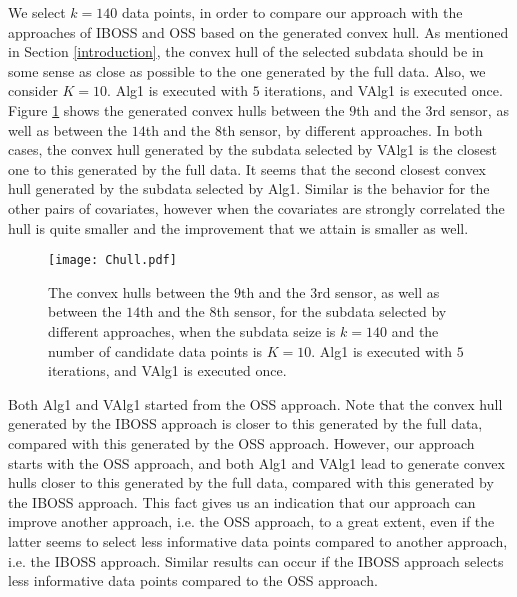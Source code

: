 \documentclass[12pt]{article}
\theoremstyle{definition}
\begin{document}
	We select $k=140$ data points, in order to compare our approach with the approaches of IBOSS and OSS based on the generated convex hull. As mentioned in Section \ref{introduction}, the convex hull of the selected subdata should be in some sense as close as possible to the one generated by the full data. Also, we consider $K=10$. Alg1 is executed with $5$ iterations, and VAlg1 is executed once. Figure \ref{chull} shows the generated convex hulls between the $9$th and the $3$rd sensor, as well as between the $14$th and the $8$th sensor, by different approaches. In both cases, the convex hull generated by the subdata selected by VAlg1 is the closest one to this generated by the full data. It seems that the second closest convex hull generated by the subdata selected by Alg1. Similar is the behavior for the other pairs of covariates, however when the covariates are strongly correlated the hull is quite smaller and the improvement that we attain is smaller as well.
	
	\begin{figure}[!thb]
		\centering
		\texttt{[image: Chull.pdf]}
		\caption{The convex hulls between the $9$th and the $3$rd sensor, as well as between the $14$th and the $8$th sensor, for the subdata selected by different approaches, when the subdata seize is $k=140$ and the number of candidate data points is $K=10$. Alg1 is executed with $5$ iterations, and VAlg1 is executed once.}
		\label{chull}
	\end{figure}
	
	Both Alg1 and VAlg1 started from the OSS approach. Note that the convex hull generated by the IBOSS approach is closer to this generated by the full data, compared with this generated by the OSS approach. However, our approach starts with the OSS approach, and both Alg1 and VAlg1 lead to generate convex hulls closer to this generated by the full data, compared with this generated by the IBOSS approach. This fact gives us an indication that our approach can improve another approach, i.e. the OSS approach, to a great extent, even if the latter seems to select less informative data points compared to another approach, i.e. the IBOSS approach. Similar results can occur if the IBOSS approach selects less informative data points compared to the OSS approach.
	
\end{document}

